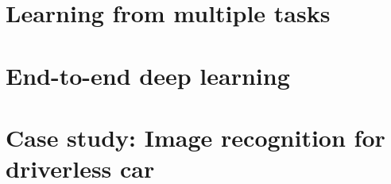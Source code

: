 \documentclass[12pt, a4paper]{article}
\numberwithin{equation}{section}
\begin{document}
\section{Learning from multiple tasks}


\section{End-to-end deep learning}


\section{Case study: Image recognition for driverless car}
\end{document}
